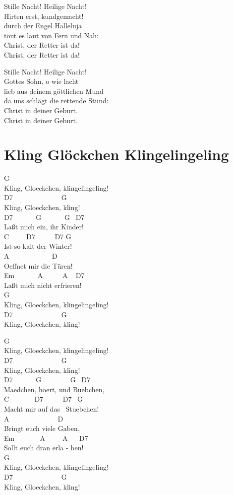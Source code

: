 \documentclass[
  letterpaper,
]{scrbook}
\begin{document}
Stille Nacht! Heilige Nacht!\\
Hirten erst, kundgemacht!\\
durch der Engel Halleluja\\
tönt es laut von Fern\textquotesingle{} und Nah:\\
Christ, der Retter ist da!\\
Christ, der Retter ist da!

Stille Nacht! Heilige Nacht!\\
Gottes Sohn, o wie lacht\\
lieb\textquotesingle{} aus deinem göttlichen Mund\\
da uns schlägt die rettende Stund\textquotesingle:\\
Christ in deiner Geburt.\\
Christ in deiner Geburt.

\hypertarget{kling-gluxf6ckchen-klingelingeling}{%
\chapter{Kling Glöckchen
Klingelingeling}\label{kling-gluxf6ckchen-klingelingeling}}

G\\
Kling, Gloeckchen, klingelingeling!\\
D7 ~ ~ ~ ~ ~ ~ ~ ~ G\\
Kling, Gloeckchen, kling!\\
D7 ~ ~ ~ ~G ~ ~ ~ ~G ~D7\\
Laßt mich ein, ihr Kinder!\\
C ~ ~ ~D7 ~ ~ ~ D7 G\\
Ist so kalt der Winter!\\
A ~ ~ ~ ~ ~ ~ ~ D\\
Oeffnet mir die Türen!\\
Em ~ ~ ~ ~A ~ ~ ~ A ~ D7\\
Laßt mich nicht erfrieren!\\
G\\
Kling, Gloeckchen, klingelingeling!\\
D7 ~ ~ ~ ~ ~ ~ ~ ~ G\\
Kling, Gloeckchen, kling! ~

G\\
Kling, Gloeckchen, klingelingeling!\\
D7 ~ ~ ~ ~ ~ ~ ~ ~ G\\
Kling, Gloeckchen, kling!\\
D7 ~ ~ ~ ~G ~ ~ ~ ~ ~G ~D7\\
Maedchen, hoert, und Buebchen,\\
C ~ ~ ~ ~ D7 ~ ~ ~ D7 ~G\\
Macht mir auf das ~Stuebchen!\\
A ~ ~ ~ ~ ~ ~ ~ ~ D\\
Bringt euch viele Gaben,\\
Em ~ ~ ~ ~ A ~ ~ ~A ~ ~D7\\
Sollt euch dran erla - ben!\\
G\\
Kling, Gloeckchen, klingelingeling!\\
D7 ~ ~ ~ ~ ~ ~ ~ ~ G\\
Kling, Gloeckchen, kling! ~
\end{document}
